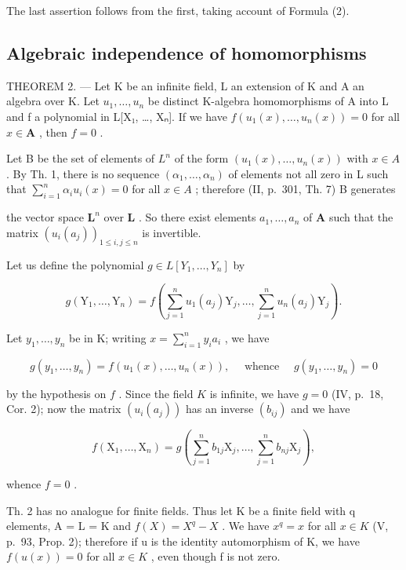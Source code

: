 The last assertion follows from the first, taking account of Formula (2).

\subsection{Algebraic independence of homomorphisms}

THEOREM 2. --- Let K be an infinite field, L an extension of K and A an algebra over K. Let \(u_1, \ldots, u_n\) be distinct K-algebra homomorphisms of A into L and f a polynomial in L{[}X₁, \ldots, Xₙ{]}. If we have \(f(u_1(x), \ldots, u_n(x)) = 0\) for all \(x \in \mathbf{A}\) , then \(f = 0\) .

Let B be the set of elements of \(L^{n}\) of the form \((u_{1}(x), \ldots, u_{n}(x))\) with \(x \in A\) . By Th. 1, there is no sequence \((\alpha_{1}, \ldots, \alpha_{n})\) of elements not all zero in L such that \(\sum_{i=1}^{n} \alpha_{i} u_{i}(x) = 0\) for all \(x \in A\) ; therefore (II, p.~301, Th. 7) B generates

the vector space \(\mathbf{L}^n\) over \(\mathbf{L}\) . So there exist elements \(a_1, \ldots, a_n\) of \(\mathbf{A}\) such that the matrix \((u_i(a_j))_{1 \leqslant i, j \leqslant n}\) is invertible.

Let us define the polynomial \(g \in L[Y_1, \ldots, Y_n]\) by

\[
g \left(\mathrm{Y} _ {1}, \dots , \mathrm{Y} _ {n}\right) = f \left(\sum_ {j = 1} ^ {n} u _ {1} \left(a _ {j}\right) \mathrm{Y} _ {j}, \dots , \sum_ {j = 1} ^ {n} u _ {n} \left(a _ {j}\right) \mathrm{Y} _ {j}\right).\tag{3}
\]

Let \(y_{1}, \ldots, y_{n}\) be in K; writing \(x = \sum_{i=1}^{n} y_{i} a_{i}\) , we have

\[
g \left(y _ {1}, \dots , y _ {n}\right) = f \left(u _ {1} (x), \dots , u _ {n} (x)\right), \quad \text { whence } \quad g \left(y _ {1}, \dots , y _ {n}\right) = 0
\]

by the hypothesis on \(f\) . Since the field \(K\) is infinite, we have \(g = 0\) (IV, p.~18, Cor. 2); now the matrix \((u_i(a_j))\) has an inverse \((b_{ij})\) and we have

\[
f \left(\mathrm{X} _ {1}, \dots , \mathrm{X} _ {n}\right) = g \left(\sum_ {j = 1} ^ {n} b _ {1 j} \mathrm{X} _ {j}, \dots , \sum_ {j = 1} ^ {n} b _ {n j} \mathrm{X} _ {j}\right),\tag{4}
\]

whence \(f = 0\) .

Th. 2 has no analogue for finite fields. Thus let K be a finite field with q elements, A = L = K and \(f(X) = X^{q} - X\) . We have \(x^{q} = x\) for all \(x \in K\) (V, p.~93, Prop. 2); therefore if u is the identity automorphism of K, we have \(f(u(x)) = 0\) for all \(x \in K\) , even though f is not zero.


